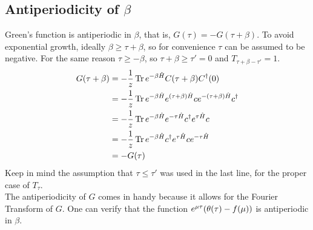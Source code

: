 \documentclass{article}
\begin{document}
\subsection{Antiperiodicity of $\beta$}
Green's function is antiperiodic in $\beta$, that is, $G(\tau) = -G(\tau+\beta)$. To avoid exponential growth, ideally $\beta \geq \tau + \beta$, so for convenience $\tau$ can be assumed to be negative. For the same reason $\tau \geq -\beta$, so $\tau + \beta \geq \tau' = 0$ and $T_{\tau + \beta - \tau'} = 1$.
\begin{align*}
G(\tau + \beta) &= -\frac{1}{z} \operatorname{Tr} e^{-\beta\hat{H}} C(\tau + \beta)C^\dagger(0) \\
&= -\frac{1}{z} \operatorname{Tr} e^{-\beta\hat{H}} e^{(\tau+\beta)\hat{H}} c e^{-(\tau + \beta)\hat{H}} c^\dagger \\
&= -\frac{1}{z} \operatorname{Tr} e^{-\beta\hat{H}} e^{-\tau\hat{H}} c^\dagger e^{\tau\hat{H}} c \\
&= -\frac{1}{z} \operatorname{Tr} e^{-\beta\hat{H}} c^\dagger e^{\tau\hat{H}} c e^{-\tau\hat{H}} \\
&= - G(\tau)
\end{align*}
Keep in mind the assumption that $\tau \leq \tau'$ was used in the last line, for the proper case of $T_\tau$. \\
The antiperiodicity of $G$ comes in handy because it allows for the Fourier Transform of $G$. One can verify that the function $e^{\mu\tau}(\operatorname{\theta}(\tau) - f(\mu))$ is antiperiodic in $\beta$.
\end{document}
